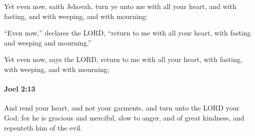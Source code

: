 			\begin{versebox}
					\item[BHS] 
					\item[LXX] 
					\item[ASV] Yet even now, saith Jehovah, turn ye unto me with all your heart, and with fasting, and with weeping, and with mourning:
					\item[NIV] “Even now,” declares the LORD, “return to me with all your heart, with fasting and weeping and mourning.”
					\item[NRSV] Yet even now, says the LORD, return to me with all your heart, with fasting, with weeping, and with mourning;
			\end{versebox}

		\paragraph{Joel 2:13} %
			\label{JOEL-2-13}

			And rend your heart, and not your garments, and turn unto the LORD your God: for he is gracious and merciful, slow to anger, and of great kindness, and repenteth him of the evil.

